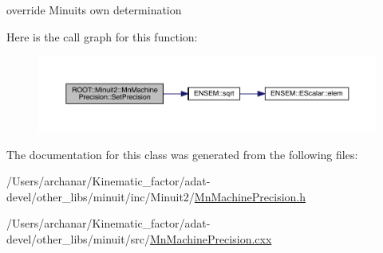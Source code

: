 override Minuit\textquotesingle{}s own determination 

Here is the call graph for this function\+:
\nopagebreak
\begin{figure}[H]
\begin{center}
\leavevmode
\includegraphics[width=350pt]{d4/d40/classROOT_1_1Minuit2_1_1MnMachinePrecision_a625938e3c6362a06d09fc76e59f366b6_cgraph}
\end{center}
\end{figure}


The documentation for this class was generated from the following files\+:\begin{DoxyCompactItemize}
\item 
/\+Users/archanar/\+Kinematic\+\_\+factor/adat-\/devel/other\+\_\+libs/minuit/inc/\+Minuit2/\mbox{\hyperlink{adat-devel_2other__libs_2minuit_2inc_2Minuit2_2MnMachinePrecision_8h}{Mn\+Machine\+Precision.\+h}}\item 
/\+Users/archanar/\+Kinematic\+\_\+factor/adat-\/devel/other\+\_\+libs/minuit/src/\mbox{\hyperlink{adat-devel_2other__libs_2minuit_2src_2MnMachinePrecision_8cxx}{Mn\+Machine\+Precision.\+cxx}}\end{DoxyCompactItemize}
